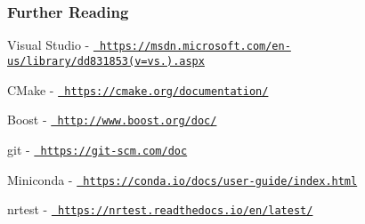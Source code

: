 \subsubsection*{Further Reading}

Visual Studio -\/ \href{https://msdn.microsoft.com/en-us/library/dd831853(v=vs.100).aspx}{\texttt{ https\+://msdn.\+microsoft.\+com/en-\/us/library/dd831853(v=vs.).\+aspx}}

C\+Make -\/ \href{https://cmake.org/documentation/}{\texttt{ https\+://cmake.\+org/documentation/}}

Boost -\/ \href{http://www.boost.org/doc/}{\texttt{ http\+://www.\+boost.\+org/doc/}}

git -\/ \href{https://git-scm.com/doc}{\texttt{ https\+://git-\/scm.\+com/doc}}

Miniconda -\/ \href{https://conda.io/docs/user-guide/index.html}{\texttt{ https\+://conda.\+io/docs/user-\/guide/index.\+html}}

nrtest -\/ \href{https://nrtest.readthedocs.io/en/latest/}{\texttt{ https\+://nrtest.\+readthedocs.\+io/en/latest/}} 